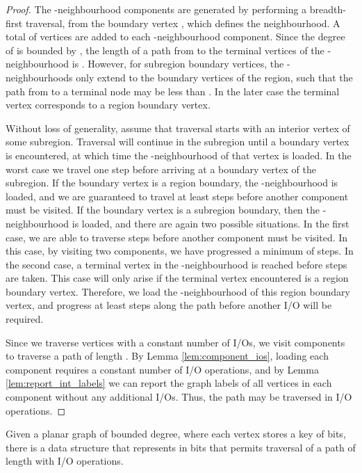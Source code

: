 \begin{proof}
  The -neighbourhood components are generated by performing a
  breadth-first traversal, from the boundary vertex , which
  defines the neighbourhood. A total of  vertices are added
  to each -neighbourhood component. Since the degree of  is
  bounded by , the length of a path from  to the terminal
  vertices of the -neighbourhood is
  . 
  However, for subregion boundary vertices, the
  -neighbourhoods only extend to the boundary vertices of the
  region, such that the path from  to a terminal node may be less
  than . 
  In the later case the terminal vertex
  corresponds to a region boundary vertex.

  Without loss of generality, assume that traversal starts with an
  interior vertex of some subregion. Traversal will continue in the
  subregion until a boundary vertex is encountered, at which time the
  -neighbourhood of that vertex is loaded. In the worst case
  we travel one step before arriving at a boundary vertex of the
  subregion. If the boundary vertex is a region boundary, the
  -neighbourhood is loaded, and we are guaranteed to travel at
  least  steps before another component must be
  visited.  If the boundary vertex is a subregion boundary, then the
  -neighbourhood is loaded, and there are again two possible
  situations. In the first case, we are able to traverse
   steps before another component must be visited. In
  this case, by visiting two components, we have progressed a minimum
  of  steps. In the second case, a terminal vertex in
  the -neighbourhood is reached before  steps
  are taken. This case will only arise if the terminal vertex
  encountered is a region boundary vertex. Therefore, we load the
  -neighbourhood of this region boundary vertex, and progress
  at least  steps along the path before another I/O
  will be required.

  Since we traverse  vertices with a constant number
  of I/Os, we visit  components
  to traverse a path of length . By Lemma \ref{lem:component_ios},
  loading each component requires a constant number of I/O operations,
  and by Lemma \ref{lem:report_int_labels} we can report the graph
  labels of all vertices in each component without any additional
  I/Os. Thus, the path may be traversed in  I/O operations.
\end{proof}

\begin{theorem}
  \label{thm:planar_graph}
  Given a planar graph  of bounded degree, where each vertex stores
  a key of  bits, there is a data structure that represents  in
   bits that permits traversal of a path of length
   with  I/O operations.
\end{theorem}

